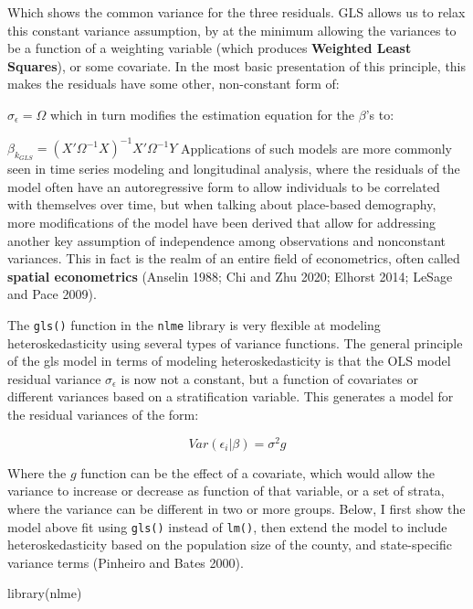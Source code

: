 \documentclass[
  letterpaper,
  DIV=11,
  numbers=noendperiod]{scrreprt}
\newenvironment{Shaded}{\begin{snugshade}}{\end{snugshade}}
\newcommand{\FunctionTok}[1]{\textcolor[rgb]{0.28,0.35,0.67}{#1}}
\newcommand{\NormalTok}[1]{\textcolor[rgb]{0.00,0.23,0.31}{#1}}
\begin{document}
Which shows the common variance for the three residuals. GLS allows us
to relax this constant variance assumption, by at the minimum allowing
the variances to be a function of a weighting variable (which produces
\textbf{Weighted Least Squares}), or some covariate. In the most basic
presentation of this principle, this makes the residuals have some
other, non-constant form of:

\(\sigma_{\epsilon} = \Omega\) which in turn modifies the estimation
equation for the \(\beta\)'s to:

\(\beta_{k_{GLS}} = (X' \Omega^{-1} X)^{-1} X' \Omega^{-1} Y\)
Applications of such models are more commonly seen in time series
modeling and longitudinal analysis, where the residuals of the model
often have an autoregressive form to allow individuals to be correlated
with themselves over time, but when talking about place-based
demography, more modifications of the model have been derived that allow
for addressing another key assumption of independence among observations
and nonconstant variances. This in fact is the realm of an entire field
of econometrics, often called \textbf{spatial econometrics} (Anselin
1988; Chi and Zhu 2020; Elhorst 2014; LeSage and Pace 2009).

The \texttt{gls()} function in the \texttt{nlme} library is very
flexible at modeling heteroskedasticity using several types of variance
functions. The general principle of the gls model in terms of modeling
heteroskedasticity is that the OLS model residual variance
\(\sigma_{\epsilon}\) is now not a constant, but a function of
covariates or different variances based on a stratification variable.
This generates a model for the residual variances of the form:

\[Var(\epsilon_i |\beta) = \sigma^2 g\]

Where the \(g\) function can be the effect of a covariate, which would
allow the variance to increase or decrease as function of that variable,
or a set of strata, where the variance can be different in two or more
groups. Below, I first show the model above fit using \texttt{gls()}
instead of \texttt{lm()}, then extend the model to include
heteroskedasticity based on the population size of the county, and
state-specific variance terms (Pinheiro and Bates 2000).

\begin{Shaded}
\begin{Highlighting}[]
\FunctionTok{library}\NormalTok{(nlme)}
\end{Highlighting}
\end{Shaded}
\end{document}

